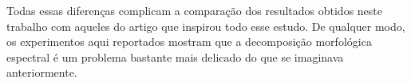 Todas essas diferenças complicam a comparação dos resultados obtidos neste
trabalho com aqueles do artigo que inspirou todo esse estudo. De qualquer modo,
os experimentos aqui reportados mostram que a decomposição morfológica espectral
é um problema bastante mais delicado do que se imaginava anteriormente.


